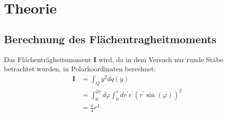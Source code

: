 \section{Theorie}
\label{sec:Theorie}

\subsection{Berechnung des Flächentragheitmoments}
\label{sec:flaechentraegheitsmoment}
Das Flächenträgheitsmoment $\mathbf{I}$ wird, da in dem Versuch nur runde Stäbe betrachtet wurden,
in Polarkoordinaten berechnet:
\begin{align}
	\mathbf{I} 
	&= \int_Q y^2 dq(y) 
	\\
	&= \int_0^{2\pi} d\varphi \int_0^r dr^\prime r^\prime 
	\left( r^\prime\sin(\varphi) \right)^2
	\\
	&= \frac{\pi}{4} r^4
\end{align}


\cite{sample}
